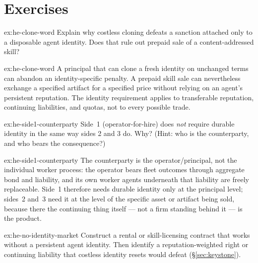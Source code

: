 \documentclass[11pt,a4paper]{article}
\theoremstyle{definition}
\theoremstyle{definition}
\theoremstyle{remark}
\begin{document}
\section{Exercises}
\label{sec:he-exercises}


\begin{pdexercise}[kind=Check,rating=1]{ex:he-clone-word}
Explain why costless cloning defeats a sanction attached only to a disposable
agent identity. Does that rule out prepaid sale of a content-addressed skill?
\end{pdexercise}
\begin{pdsolution}{ex:he-clone-word}
A principal that can clone a fresh identity on unchanged terms can abandon an
identity-specific penalty. A prepaid skill sale can nevertheless exchange a
specified artifact for a specified price without relying on an agent's persistent
reputation. The identity requirement applies to transferable reputation,
continuing liabilities, and quotas, not to every possible trade.
\end{pdsolution}
\begin{pdexercise}[kind=Check,rating=1]{ex:he-side1-counterparty}
Side~1 (operator-for-hire) does \emph{not} require durable identity in the
  same way sides 2 and 3 do. Why? (Hint: who is the counterparty, and who bears
  the consequence?)
\end{pdexercise}
\begin{pdsolution}{ex:he-side1-counterparty}
The counterparty is the operator/principal, not the individual worker
process: the operator bears fleet outcomes through aggregate bond and liability,
and its own worker agents underneath that liability are freely replaceable.
Side~1 therefore needs durable identity only at the principal level; sides~2 and~3
need it at the level of the specific asset or artifact being sold, because there
the continuing thing itself --- not a firm standing behind it --- is the product.
\end{pdsolution}
\begin{pdexercise}[kind=Open,rating=3]{ex:he-no-identity-market}
Construct a rental or skill-licensing contract that works without a persistent
agent identity. Then identify a reputation-weighted right or continuing liability
that costless identity resets would defeat (\S\ref{sec:keystone}).
\end{pdexercise}
\end{document}
